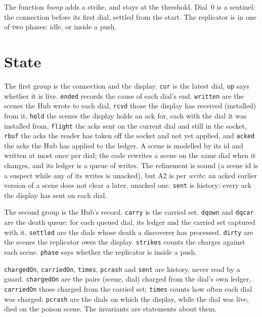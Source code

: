 \documentclass[a4paper,10pt,fleqn]{article}
\begin{document}
The function \emph{bump} adds a strike, and stays at the threshold.  Dial~$0$ is
a sentinel: the connection before its first dial, settled from the start.  The
replicator is in one of two phases: idle, or inside a push.

\section{State}

The first group is the connection and the display.  \texttt{cur} is the latest
dial, \texttt{up} says whether it is live.  \texttt{ended} records the cause of
each dial's end.  \texttt{written} are the scenes the Hub wrote to each dial,
\texttt{rcvd} those the display has received (installed) from it, \texttt{hold}
the scenes the display holds an ack for, each with the dial it was installed
from, \texttt{flight} the acks sent on the current dial and still in the socket,
\texttt{rbuf} the acks the reader has taken off the socket and not yet applied,
and \texttt{acked} the acks the Hub has applied to the ledger.  A scene is
modelled by its id and written at most once per dial; the code rewrites a scene
on the same dial when it changes, and its ledger is a queue of writes.  The
refinement is sound (a scene id is a suspect while any of its writes is
unacked), but A2 is per \emph{write}: an acked earlier version of a scene does
not clear a later, unacked one.  \texttt{sent} is history: every ack the
display has sent on each dial.

The second group is the Hub's record.  \texttt{carry} is the carried set.
\texttt{dqown} and \texttt{dqcar} are the death queue: for each queued dial, its
ledger and the carried set captured with it.  \texttt{settled} are the dials
whose death a discoverer has processed.  \texttt{dirty} are the scenes the
replicator owes the display.  \texttt{strikes} counts the charges against each
scene.  \texttt{phase} says whether the replicator is inside a push.

\texttt{chargedOn}, \texttt{carriedOn}, \texttt{times}, \texttt{pcrash} and
\texttt{sent} are history, never read by a guard.  \texttt{chargedOn} are the
pairs (scene, dial) charged from the dial's own ledger, \texttt{carriedOn} those
charged from the carried set; \texttt{times} counts how often each dial was
charged; \texttt{pcrash} are the dials on which the display, while the dial was
live, died on the poison scene.  The invariants are statements about them.
\end{document}
